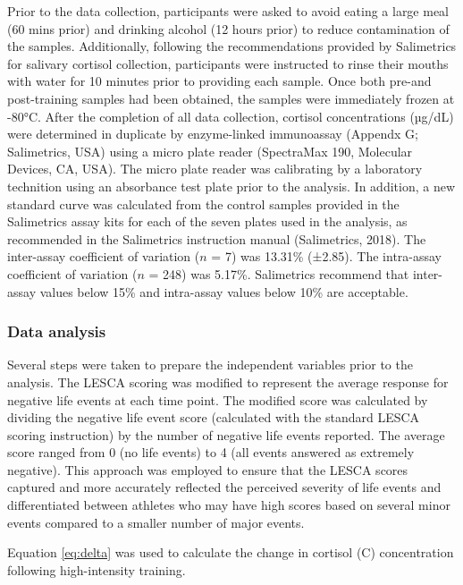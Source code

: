 \documentclass[man,floatsintext]{apa6}
\begin{document}
Prior to the data collection, participants were asked to avoid eating a large meal (60 mins prior) and drinking alcohol (12 hours prior) to reduce contamination of the samples.
Additionally, following the recommendations provided by Salimetrics for salivary cortisol collection, participants were instructed to rinse their mouths with water for 10 minutes prior to providing each sample.
Once both pre-and post-training samples had been obtained, the samples were immediately frozen at -80°C. After the completion of all data collection, cortisol concentrations (µg/dL) were determined in duplicate by enzyme-linked immunoassay (Appendx G; Salimetrics, USA) using a micro plate reader (SpectraMax 190, Molecular Devices, CA, USA).
The micro plate reader was calibrating by a laboratory technition using an absorbance test plate prior to the analysis.
In addition, a new standard curve was calculated from the control samples provided in the Salimetrics assay kits for each of the seven plates used in the analysis, as recommended in the Salimetrics instruction manual (Salimetrics, 2018).
The inter-assay coefficient of variation (\(n\) = 7) was 13.31\% (±2.85). The intra-assay coefficient of variation (\(n\) = 248) was 5.17\%.
Salimetrics recommend that inter-assay values below 15\% and intra-assay values below 10\% are acceptable.

\hypertarget{data-analysis-1}{%
\subsubsection{Data analysis}\label{data-analysis-1}}

Several steps were taken to prepare the independent variables prior to the analysis.
The LESCA scoring was modified to represent the average response for negative life events at each time point.
The modified score was calculated by dividing the negative life event score (calculated with the standard LESCA scoring instruction) by the number of negative life events reported.
The average score ranged from 0 (no life events) to 4 (all events answered as extremely negative).
This approach was employed to ensure that the LESCA scores captured and more accurately reflected the perceived severity of life events and differentiated between athletes who may have high scores based on several minor events compared to a smaller number of major events.

Equation \eqref{eq:delta} was used to calculate the change in cortisol (C) concentration following high-intensity training.
\end{document}

